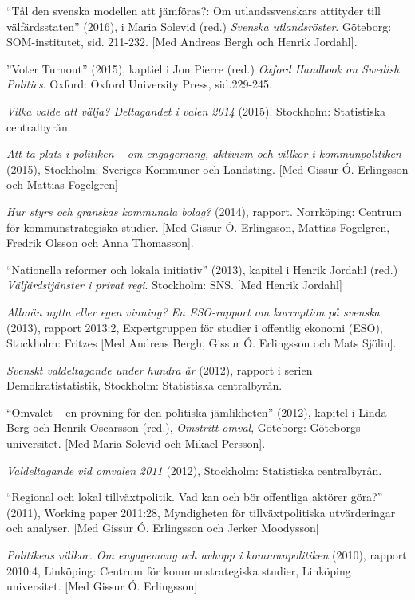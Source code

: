 \documentclass[11pt,]{article}
\begin{document}
``Tål den svenska modellen att jämföras?: Om utlandssvenskars attityder
till välfärdsstaten'' (2016), i Maria Solevid (red.) \emph{Svenska
utlandsröster}. Göteborg: SOM-institutet, sid. 211-232. {[}Med Andreas
Bergh och Henrik Jordahl{]}.

''Voter Turnout'' (2015), kaptiel i Jon Pierre (red.) \emph{Oxford
Handbook on Swedish Politics}. Oxford: Oxford University Press,
sid.229-245.

\emph{Vilka valde att välja? Deltagandet i valen 2014} (2015).
Stockholm: Statistiska centralbyrån.

\emph{Att ta plats i politiken -- om engagemang, aktivism och villkor i
kommunpolitiken} (2015), Stockholm: Sveriges Kommuner och Landsting.
{[}Med Gissur Ó. Erlingsson och Mattias Fogelgren{]}

\emph{Hur styrs och granskas kommunala bolag?} (2014), rapport.
Norrköping: Centrum för kommunstrategiska studier. {[}Med Gissur Ó.
Erlingsson, Mattias Fogelgren, Fredrik Olsson och Anna Thomasson{]}.

``Nationella reformer och lokala initiativ'' (2013), kapitel i Henrik
Jordahl (red.) \emph{Välfärdstjänster i privat regi}. Stockholm: SNS.
{[}Med Henrik Jordahl{]}

\emph{Allmän nytta eller egen vinning? En ESO-rapport om korruption på
svenska} (2013), rapport 2013:2, Expertgruppen för studier i offentlig
ekonomi (ESO), Stockholm: Fritzes {[}Med Andreas Bergh, Gissur Ó.
Erlingsson och Mats Sjölin{]}.

\emph{Svenskt valdeltagande under hundra år} (2012), rapport i serien
Demokratistatistik, Stockholm: Statistiska centralbyrån.

``Omvalet -- en prövning för den politiska jämlikheten'' (2012), kapitel
i Linda Berg och Henrik Oscarsson (red.), \emph{Omstritt omval},
Göteborg: Göteborgs universitet. {[}Med Maria Solevid och Mikael
Persson{]}.

\emph{Valdeltagande vid omvalen 2011} (2012), Stockholm: Statistiska
centralbyrån.

``Regional och lokal tillväxtpolitik. Vad kan och bör offentliga aktörer
göra?'' (2011), Working paper 2011:28, Myndigheten för tillväxtpolitiska
utvärderingar och analyser. {[}Med Gissur Ó. Erlingsson och Jerker
Moodysson{]}

\emph{Politikens villkor. Om engagemang och avhopp i kommunpolitiken}
(2010), rapport 2010:4, Linköping: Centrum för kommunstrategiska
studier, Linköping universitet. {[}Med Gissur Ó. Erlingsson{]}
\end{document}
